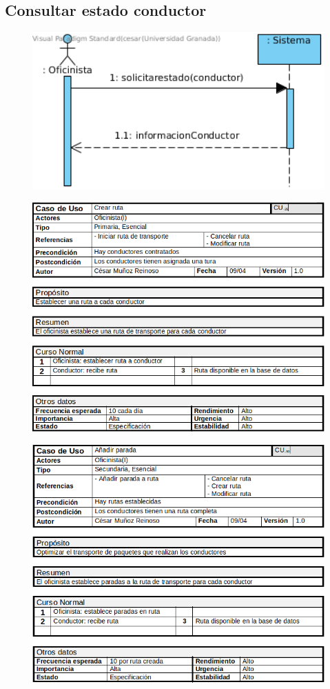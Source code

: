 \subsection{Consultar estado conductor}
\begin{figure}[H]
	\centering
	\includegraphics[width=16cm]{6}
\end{figure}
\begin{figure}[H]
	\centering
	\includegraphics[width=16cm]{7}
\end{figure}
\begin{figure}[H]
	\centering
	\includegraphics[width=16cm]{8}
\end{figure}
